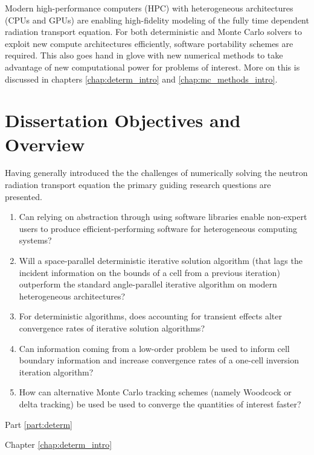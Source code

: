 Modern high-performance computers (HPC) with heterogeneous architectures (CPUs and GPUs) are enabling high-fidelity modeling of the fully time dependent radiation transport equation.
For both deterministic and Monte Carlo solvers to exploit new compute architectures efficiently, software portability schemes are required. 
This also goes hand in glove with new numerical methods to take advantage of new computational power for problems of interest. More on this is discussed in chapters \ref{chap:determ_intro} and \ref{chap:mc_methods_intro}.

\section{Dissertation Objectives and Overview}

Having generally introduced the the challenges of numerically solving the neutron radiation transport equation the primary guiding research questions are presented.
\begin{enumerate}
    \item Can relying on abstraction through using software libraries enable non-expert users to produce efficient-performing software for heterogeneous computing systems?
    \item Will a space-parallel deterministic iterative solution algorithm (that lags the incident information on the bounds of a cell from a previous iteration) outperform the standard angle-parallel iterative algorithm on modern heterogeneous architectures?
    \item For deterministic algorithms, does accounting for transient effects alter convergence rates of iterative solution algorithms?
    \item Can information coming from a low-order problem be used to inform cell boundary information and increase convergence rates of a one-cell inversion iteration algorithm?
    \item How can alternative Monte Carlo tracking schemes (namely Woodcock or delta tracking) be used be used to converge the quantities of interest faster?
\end{enumerate}


Part \ref{part:determ}

Chapter \ref{chap:determ_intro}

